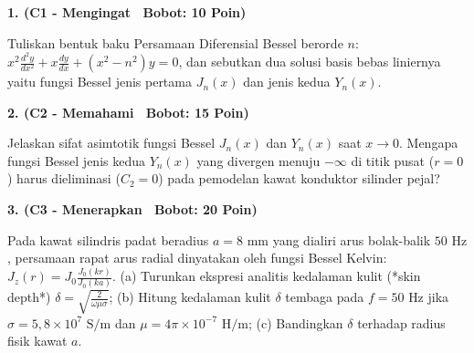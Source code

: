 \documentclass[10pt,a4paper]{article}
\begin{document}
\par
\vspace{1mm}

\noindent\textbf{1. (C1 - Mengingat \textbar\ Bobot: 10 Poin)}\par\vspace{0.8mm}
{\footnotesize Tuliskan bentuk baku Persamaan Diferensial Bessel berorde $n$: $x^2 \frac{d^2 y}{dx^2} + x \frac{dy}{dx} + (x^2 - n^2)y = 0$, dan sebutkan dua solusi basis bebas liniernya yaitu fungsi Bessel jenis pertama $J_n(x)$ dan jenis kedua $Y_n(x)$.}\par

\vspace{2.5mm}

\noindent\textbf{2. (C2 - Memahami \textbar\ Bobot: 15 Poin)}\par\vspace{0.8mm}
{\footnotesize Jelaskan sifat asimtotik fungsi Bessel $J_n(x)$ dan $Y_n(x)$ saat $x \to 0$. Mengapa fungsi Bessel jenis kedua $Y_n(x)$ yang divergen menuju $-\infty$ di titik pusat ($r = 0$) harus dieliminasi ($C_2 = 0$) pada pemodelan kawat konduktor silinder pejal?}\par

\vspace{2.5mm}

\noindent\textbf{3. (C3 - Menerapkan \textbar\ Bobot: 20 Poin)}\par\vspace{0.8mm}
\noindent\begin{minipage}[t]{0.60\textwidth}%
  {\footnotesize Pada kawat silindris padat beradius $a = 8\text{ mm}$ yang dialiri arus bolak-balik $50\text{ Hz}$, persamaan rapat arus radial dinyatakan oleh fungsi Bessel Kelvin: $J_z(r) = J_0 \frac{J_0(k r)}{J_0(k a)}$. (a) Turunkan ekspresi analitis kedalaman kulit (*skin depth*) $\delta = \sqrt{\frac{2}{\omega \mu \sigma}}$; (b) Hitung kedalaman kulit $\delta$ tembaga pada $f = 50\text{ Hz}$ jika $\sigma = 5{,}8 \times 10^7\text{ S/m}$ dan $\mu = 4\pi \times 10^{-7}\text{ H/m}$; (c) Bandingkan $\delta$ terhadap radius fisik kawat $a$.}%
\end{minipage}%
\hfill%
\begin{minipage}[t]{0.37\textwidth}%
  \centering
\end{minipage}\par
\end{document}
